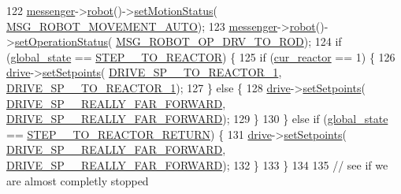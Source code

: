 \begin{DoxyCode}
122                 \hyperlink{class_threaded_robot_a7ff65f6f18c5d3a9d5823e0a00b46c9f}{messenger}->\hyperlink{class_messenger_aa07992df20b2aee6d2c4defd8d6b110c}{robot}()->\hyperlink{class_robot_data_a72b1b729501cd7a0620e83c5d4d9a714}{setMotionStatus}(
      \hyperlink{config_8h_a12bcb79900d7ce0678284ea659f55f87}{MSG\_ROBOT\_MOVEMENT\_AUTO});
123                 \hyperlink{class_threaded_robot_a7ff65f6f18c5d3a9d5823e0a00b46c9f}{messenger}->\hyperlink{class_messenger_aa07992df20b2aee6d2c4defd8d6b110c}{robot}()->\hyperlink{class_robot_data_a2676bf89bd178c2a9a38236d936a49c0}{setOperationStatus}(
      \hyperlink{config_8h_a07b36fc0265003a9ba81111a770f1ce9}{MSG\_ROBOT\_OP\_DRV\_TO\_ROD});
124                 \textcolor{keywordflow}{if} (\hyperlink{class_threaded_robot_a92782be4dc437d7e84b04d20a39a5de3}{global\_state} == \hyperlink{_threaded_robot_8hpp_a388ca9e0532aeb38988df56f8226b6f9}{STEP\_\_TO\_REACTOR}) \{
125                     \textcolor{keywordflow}{if} (\hyperlink{class_threaded_robot_a3c2f2358f32ba58846b13e95b3c55527}{cur\_reactor} == 1) \{
126                         \hyperlink{class_threaded_robot_ad666af7d773c8096210f6b5c4d060086}{drive}->\hyperlink{class_drive_train_a824147fd2c57fe25c0f64a80218ca39e}{setSetpoints}(
      \hyperlink{config_8h_a5c741381c7f5ad8ab6bfc68b314d9544}{DRIVE\_SP\_\_TO\_REACTOR\_1}, \hyperlink{config_8h_a5c741381c7f5ad8ab6bfc68b314d9544}{DRIVE\_SP\_\_TO\_REACTOR\_1});
127                     \} \textcolor{keywordflow}{else} \{
128                         \hyperlink{class_threaded_robot_ad666af7d773c8096210f6b5c4d060086}{drive}->\hyperlink{class_drive_train_a824147fd2c57fe25c0f64a80218ca39e}{setSetpoints}(
      \hyperlink{config_8h_aa4b73094139c22971d37a0b1609b791a}{DRIVE\_SP\_\_REALLY\_FAR\_FORWARD}, 
      \hyperlink{config_8h_aa4b73094139c22971d37a0b1609b791a}{DRIVE\_SP\_\_REALLY\_FAR\_FORWARD});
129                     \}
130                 \} \textcolor{keywordflow}{else} \textcolor{keywordflow}{if} (\hyperlink{class_threaded_robot_a92782be4dc437d7e84b04d20a39a5de3}{global\_state} == \hyperlink{_threaded_robot_8hpp_a4fc7e302c22b562e209b43ca06b8965d}{STEP\_\_TO\_REACTOR\_RETURN}) \{
131                     \hyperlink{class_threaded_robot_ad666af7d773c8096210f6b5c4d060086}{drive}->\hyperlink{class_drive_train_a824147fd2c57fe25c0f64a80218ca39e}{setSetpoints}(
      \hyperlink{config_8h_aa4b73094139c22971d37a0b1609b791a}{DRIVE\_SP\_\_REALLY\_FAR\_FORWARD}, 
      \hyperlink{config_8h_aa4b73094139c22971d37a0b1609b791a}{DRIVE\_SP\_\_REALLY\_FAR\_FORWARD});
132                 \}
133             \}
134 
135             \textcolor{comment}{// see if we are almost completly stopped}

\end{DoxyCode}
